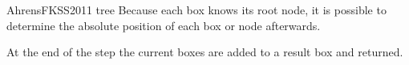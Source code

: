\begin{gdalgorithm}{AhrensFKSS2011 tree}
  Because each box knows its root node, it is possible to determine the
  absolute position of each box or node afterwards.  
  
  At the end of the step the current boxes are added to a result box and
  returned. 
\end{gdalgorithm}


